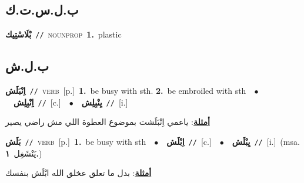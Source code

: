 \documentclass[10pt,a4paper,twoside]{article} %
\begin{document}
\begin{multicols}{2}
\vspace{-3mm}
\subsection*{\color{blue}\foreignlanguage{arabic}{ب.ل.س.ت.ك}\color{blue}{ (ntws)}} 

{\setlength\topsep{0pt}\textbf{\foreignlanguage{arabic}{بْلَاسْتِيك}}\ {\color{gray}\texttt{//}\color{black}}\ \textsc{noun\textunderscore prop}\ \textbf{1.}~plastic\ } \vspace{2mm}

\vspace{-3mm}
\subsection*{\color{blue}\foreignlanguage{arabic}{ب.ل.ش}\color{blue}{}} 

{\setlength\topsep{0pt}\textbf{\foreignlanguage{arabic}{اِنْبَلَش}}\ {\color{gray}\texttt{//}\color{black}}\ \textsc{verb}\ [p.]\ \textbf{1.}~be busy with sth.  \textbf{2.}~be embroiled with sth\ \ $\bullet$\ \ \setlength\topsep{0pt}\textbf{\foreignlanguage{arabic}{اِنْبِلِش}}\ {\color{gray}\texttt{//}\color{black}}\ [c.]\ \ $\bullet$\ \ \setlength\topsep{0pt}\textbf{\foreignlanguage{arabic}{يِنْبِلِش}}\ {\color{gray}\texttt{//}\color{black}}\ [i.]\  \begin{flushright}\color{gray}\foreignlanguage{arabic}{\textbf{\underline{\foreignlanguage{arabic}{أمثلة}}}: ياعمي اِنْبَلَشت بموضوع العطوة اللي مش راضي يصير}\end{flushright}\color{black}} \vspace{2mm}

{\setlength\topsep{0pt}\textbf{\foreignlanguage{arabic}{بَلَش}}\ {\color{gray}\texttt{//}\color{black}}\ \textsc{verb}\ [p.]\ \textbf{1.}~be busy with sth\ \ $\bullet$\ \ \setlength\topsep{0pt}\textbf{\foreignlanguage{arabic}{اِبْلَش}}\ {\color{gray}\texttt{//}\color{black}}\ [c.]\ \ $\bullet$\ \ \setlength\topsep{0pt}\textbf{\foreignlanguage{arabic}{يِبْلَش}}\ {\color{gray}\texttt{//}\color{black}}\ [i.]\ \color{gray}(msa. \foreignlanguage{arabic}{يَنْشَغِل}~\foreignlanguage{arabic}{\textbf{١.}})\color{black}\  \begin{flushright}\color{gray}\foreignlanguage{arabic}{\textbf{\underline{\foreignlanguage{arabic}{أمثلة}}}: بدل ما تعلق عخلق الله ابْلَش بنفسك}\end{flushright}\color{black}} \vspace{2mm}


\end{multicols}
\end{document}
